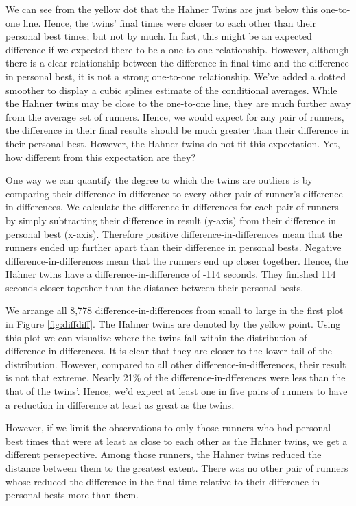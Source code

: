 \documentclass[12pt,titlepage]{article}
\begin{document}
We can see from the yellow dot that the Hahner Twins are just below this one-to-one line.  Hence, the twins' final times were closer to each other than their personal best times; but not by much.  In fact, this might be an expected difference if we expected there to be a one-to-one relationship.     However, although there is a clear relationship between the difference in final time and the difference in personal best, it is not a strong one-to-one relationship.  We've added a dotted smoother to display a cubic splines estimate of the conditional averages.  While the Hahner twins may be close to the one-to-one line, they are much further away from the average set of runners.  Hence, we would expect for any pair of runners, the difference in their final results should be much greater than their difference in their personal best.  However, the Hahner twins do not fit this expectation.   Yet, how different from this expectation are they?

One way we can quantify the degree to which the twins are outliers is by comparing their difference in difference to every other pair of runner's difference-in-differences.  We calculate the difference-in-differences for each pair of runners by simply subtracting their difference in result (y-axis) from their difference in personal best (x-axis).  Therefore positive difference-in-differences mean that the runners ended up further apart than their difference in personal bests.  Negative difference-in-differences mean that the runners end up closer together.  Hence, the Hahner twins have a difference-in-difference of -114 seconds.  They finished 114 seconds closer together than the distance between their personal bests.  

We arrange all 8,778 difference-in-differences from small to large in the first plot in Figure \ref{fig:diffdiff}. The Hahner twins are denoted by the yellow point.  Using this plot we can visualize where the twins fall within the distribution of difference-in-differences.  It is clear that they are closer to the lower tail of the distribution.  However, compared to all other difference-in-differences, their result is not that extreme.  Nearly 21\% of the difference-in-dfferences were less than the that of the twins'. Hence, we'd expect at least one in five pairs of runners to have a reduction in difference at least as great as the twins.

However, if we limit the observations to only those runners who had personal best times that were at least as close to each other as the Hahner twins, we get a different persepective.  Among those runners,  the Hahner twins reduced the distance between them to the greatest extent.  There was no other pair of runners whose reduced the difference in the final time relative to their difference in personal bests more than them.         
\end{document}
